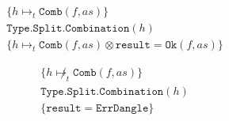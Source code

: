\documentclass[a4paper, 10pt]{article}
\begin{document}
\begin{minipage}[t]{0.5\linewidth}
\begin{gather*}
\{ h \mapsto_t \mathtt{Comb}(f, as) \} \\
\mathtt{Type.Split.Combination}(h) \\
\{ h \mapsto_t \mathtt{Comb}(f, as) \otimes \mathtt{result} = \mathtt{Ok}(f, as) \}
\end{gather*}
\end{minipage}
\begin{minipage}[t]{0.5\linewidth}
\begin{gather*}
\{ h \not\mapsto_t \mathtt{Comb}(f, as) \} \\
\mathtt{Type.Split.Combination}(h) \\
\{ \mathtt{result} = \mathtt{ErrDangle} \}
\end{gather*}
\end{minipage}
\end{document}
